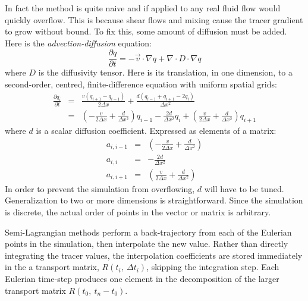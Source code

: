 \documentclass[11pt]{article}
\begin{document}
In fact the method is quite naive and if applied to any real fluid flow would 
quickly overflow.
This is because shear flows and mixing cause the tracer gradient to grow without bound.
To fix this, some amount of diffusion must be added.  Here is the 
{\it advection-diffusion} equation:
\begin{equation}
\frac{\partial q}{\partial t} = - \vec v \cdot \nabla q + \nabla \cdot D \cdot \nabla q
\label{advection_diffusion}
\end{equation}
where $D$ is the diffusivity tensor.
Here is its translation, in one dimension, to a second-order, centred,
finite-difference equation with uniform spatial grids:
\begin{eqnarray}
\frac{\partial q_i}{\partial t} & = & \frac{v(q_{i+1} - q_{i-1})}{2 \Delta x} +
	\frac{d (q_{i-1} + q_{i+1} - 2 q_i)}{\Delta x^2} \\
& = & \left (- \frac{v}{2 \Delta x} + \frac{d}{\Delta x^2} \right ) q_{i-1} -
	\frac{2 d}{\Delta x^2} q_i + 
	\left (\frac{v}{2 \Delta x} + \frac{d}{\Delta x^2} \right ) q_{i+1} \label{finite_difference_diffusion}
\end{eqnarray}
where $d$ is a scalar diffusion coefficient.
Expressed as elements of a matrix:
\begin{eqnarray}
a_{i,i-1} & = & \left (- \frac{v}{2 \Delta x} + \frac{d}{\Delta x^2} \right ) \\
	a_{i,i} & = & -\frac{2 d}{\Delta x^2} \\
a_{i,i+1} & = & \left (\frac{v}{2 \Delta x} + \frac{d}{\Delta x^2} \right )
\end{eqnarray}
In order to prevent the simulation from overflowing, $d$ will have to be tuned.
Generalization to two or more dimensions is straightforward.
Since the simulation is discrete, the actual order of points in the
vector or matrix is arbitrary.

Semi-Lagrangian methods perform a back-trajectory from each of the Eulerian
points in the simulation, then interpolate the new value.  Rather than
directly integrating the tracer values, 
the interpolation coefficients are stored immediately
in the a transport matrix, $R(t_i,~\Delta t_i)$, skipping the integration
step.
Each Eulerian time-step produces one element in the decomposition of the
larger transport matrix $R(t_0,~t_n-t_0)$.
\end{document}
